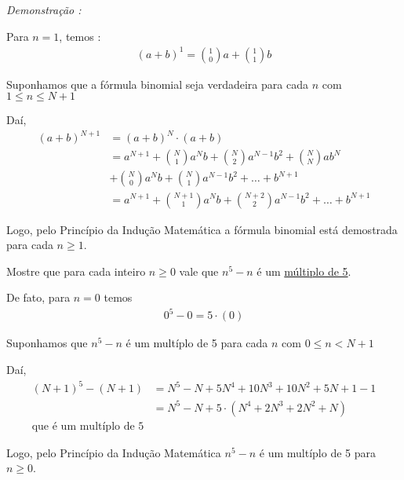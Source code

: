 \textit{Demonstração : }

Para $n=1$, temos :
\begin{align*}
(a+b)^1 = \binom{1}{0}a + \binom{1}{1}b 
\end{align*}

Suponhamos que a fórmula binomial seja verdadeira para cada $n$ com $1 \leq n \leq N+1$

Daí,
\begin{align*}
(a+b)^{N+1} &= (a+b)^{N} \cdot (a+b) \\ 
&= a^{N+1} + \binom{N}{1}a^{N}b + \binom{N}{2}a^{N-1}b^2 + \binom{N}{N}ab^{N} \\
&+ \binom{N}{0}a^{N}b + \binom{N}{1}a^{N-1}b^2 + \dotsc + b^{N+1} \\
&= a^{N+1} + \binom{N+1}{1}a^{N}b + \binom{N+2}{2}a^{N-1}b^2 + \dotsc + b^{N+1}
\end{align*}

Logo, pelo Princípio da Indução Matemática a fórmula binomial está demostrada para cada $n \ge 1$.

\vspace{0.5cm}
\begin{exemplo}[]
Mostre que para cada inteiro $n \ge 0$ vale que $n^5 - n$ é um \underline{múltiplo de 5}.
\end{exemplo}
 
De fato, para $n = 0$ temos
\begin{align*}
0^5 - 0 = 5 \cdot (0)
\end{align*}

Suponhamos que $n^5 - n$ é um multíplo de 5 para cada $n$ com $0 \leq n < N+1$

Daí,
\begin{align*}
(N+1)^5 - (N+1) &= N^5 - N + 5N^4 + 10N^3 + 10N^2 + 5N + 1 - 1 \\
&= N^5 - N + 5 \cdot (N^4 + 2N^3 + 2N^2 + N) \\
\text{que é um multíplo de 5}
\end{align*}

Logo, pelo Princípio da Indução Matemática $n^5 - n$ é um multíplo de 5 para $n \ge 0$. 
